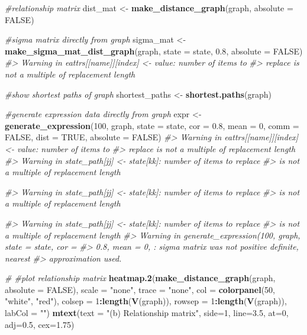 \documentclass[]{article}
\newenvironment{Shaded}{\begin{snugshade}}{\end{snugshade}}
\newcommand{\CommentTok}[1]{\textcolor[rgb]{0.56,0.35,0.01}{\textit{#1}}}
\newcommand{\DataTypeTok}[1]{\textcolor[rgb]{0.13,0.29,0.53}{#1}}
\newcommand{\DecValTok}[1]{\textcolor[rgb]{0.00,0.00,0.81}{#1}}
\newcommand{\FloatTok}[1]{\textcolor[rgb]{0.00,0.00,0.81}{#1}}
\newcommand{\KeywordTok}[1]{\textcolor[rgb]{0.13,0.29,0.53}{\textbf{#1}}}
\newcommand{\NormalTok}[1]{#1}
\newcommand{\OperatorTok}[1]{\textcolor[rgb]{0.81,0.36,0.00}{\textbf{#1}}}
\newcommand{\OtherTok}[1]{\textcolor[rgb]{0.56,0.35,0.01}{#1}}
\newcommand{\StringTok}[1]{\textcolor[rgb]{0.31,0.60,0.02}{#1}}
\begin{document}
\begin{Shaded}
\begin{Highlighting}[]
{\CommentTok{#relationship matrix}
\NormalTok{dist_mat <-}\StringTok{ }\KeywordTok{make_distance_graph}\NormalTok{(graph, }\DataTypeTok{absolute =} \OtherTok{FALSE}\NormalTok{)}

\CommentTok{#sigma matrix directly from graph}
\NormalTok{sigma_mat <-}\StringTok{ }\KeywordTok{make_sigma_mat_dist_graph}\NormalTok{(graph, }\DataTypeTok{state =}\NormalTok{ state, }\FloatTok{0.8}\NormalTok{, }\DataTypeTok{absolute =} \OtherTok{FALSE}\NormalTok{)}
\CommentTok{#> Warning in eattrs[[name]][index] <- value: number of items to}
\CommentTok{#> replace is not a multiple of replacement length}

\CommentTok{#show shortest paths of graph}
\NormalTok{shortest_paths <-}\StringTok{ }\KeywordTok{shortest.paths}\NormalTok{(graph)}

\CommentTok{#generate expression data directly from graph}
\NormalTok{expr <-}\StringTok{ }\KeywordTok{generate_expression}\NormalTok{(}\DecValTok{100}\NormalTok{, graph, }\DataTypeTok{state =}\NormalTok{ state, }\DataTypeTok{cor =} \FloatTok{0.8}\NormalTok{, }\DataTypeTok{mean =} \DecValTok{0}\NormalTok{, }\DataTypeTok{comm =} \OtherTok{FALSE}\NormalTok{,}
                            \DataTypeTok{dist =} \OtherTok{TRUE}\NormalTok{, }\DataTypeTok{absolute =} \OtherTok{FALSE}\NormalTok{)}
\CommentTok{#> Warning in eattrs[[name]][index] <- value: number of items to}
\CommentTok{#> replace is not a multiple of replacement length}
\CommentTok{#> Warning in state_path[jj] <- state[kk]: number of items to replace}
\CommentTok{#> is not a multiple of replacement length}

\CommentTok{#> Warning in state_path[jj] <- state[kk]: number of items to replace}
\CommentTok{#> is not a multiple of replacement length}

\CommentTok{#> Warning in state_path[jj] <- state[kk]: number of items to replace}
\CommentTok{#> is not a multiple of replacement length}
\CommentTok{#> Warning in generate_expression(100, graph, state = state, cor =}
\CommentTok{#> 0.8, mean = 0, : sigma matrix was not positive definite, nearest}
\CommentTok{#> approximation used.}

\CommentTok{# #plot relationship matrix}
\KeywordTok{heatmap.2}\NormalTok{(}\KeywordTok{make_distance_graph}\NormalTok{(graph, }\DataTypeTok{absolute =} \OtherTok{FALSE}\NormalTok{),}
          \DataTypeTok{scale =} \StringTok{"none"}\NormalTok{, }\DataTypeTok{trace =} \StringTok{"none"}\NormalTok{, }\DataTypeTok{col =} \KeywordTok{colorpanel}\NormalTok{(}\DecValTok{50}\NormalTok{, }\StringTok{"white"}\NormalTok{, }\StringTok{"red"}\NormalTok{),}
\DataTypeTok{colsep =} \DecValTok{1}\OperatorTok{:}\KeywordTok{length}\NormalTok{(}\KeywordTok{V}\NormalTok{(graph)), }\DataTypeTok{rowsep =} \DecValTok{1}\OperatorTok{:}\KeywordTok{length}\NormalTok{(}\KeywordTok{V}\NormalTok{(graph)), }\DataTypeTok{labCol =} \StringTok{""}\NormalTok{)}
\KeywordTok{mtext}\NormalTok{(}\DataTypeTok{text =} \StringTok{"(b) Relationship matrix"}\NormalTok{, }\DataTypeTok{side=}\DecValTok{1}\NormalTok{, }\DataTypeTok{line=}\FloatTok{3.5}\NormalTok{, }\DataTypeTok{at=}\DecValTok{0}\NormalTok{, }\DataTypeTok{adj=}\FloatTok{0.5}\NormalTok{, }\DataTypeTok{cex=}\FloatTok{1.75}\NormalTok{)}

}
\end{Highlighting}
\end{Shaded}
\end{document}
